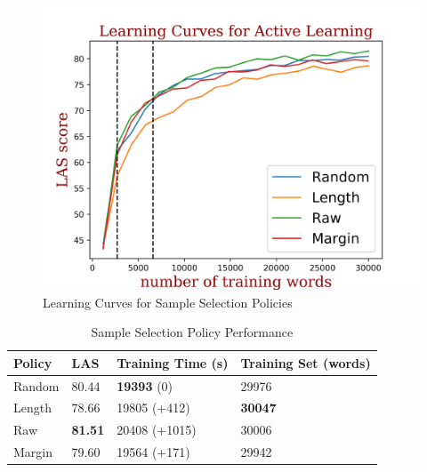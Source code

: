 \documentclass[11pt,letterpaper]{article}
\begin{document}
\begin{figure}
\includegraphics[scale=0.7]{curve.png}
\caption{Learning Curves for Sample Selection Policies}
\label{fig:curve}
\end{figure}

\begin{table}[]
\centering
\begin{tabular}{|l|l|l|l|}
\hline
Policy & LAS   & Training Time (s) & Training Set (words)\\ \hline\hline
Random & 80.44 & \textbf{19393} (0) &  29976 \\ \hline
Length & 78.66 & 19805 (+412)  & \textbf{30047} \\ \hline
Raw    & \textbf{81.51} & 20408 (+1015) & 30006\\ \hline
Margin & 79.60 & 19564 (+171)  & 29942 \\ \hline
\end{tabular}
\caption{Sample Selection Policy Performance}
\label{valid}
\end{table}

%
\end{document}
